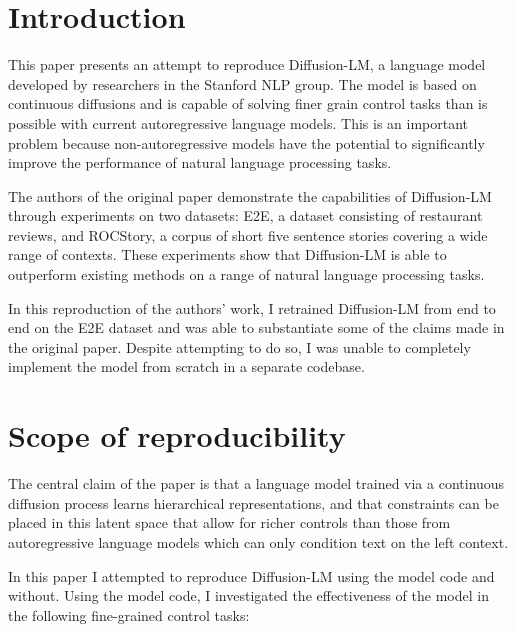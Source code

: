 \section{Introduction}

This paper presents an attempt to reproduce Diffusion-LM, a language model developed by researchers in the Stanford NLP group. The model is based on continuous diffusions and is capable of solving finer grain control tasks than is possible with current autoregressive language models. This is an important problem because non-autoregressive models have the potential to significantly improve the performance of natural language processing tasks.

The authors of the original paper demonstrate the capabilities of Diffusion-LM through experiments on two datasets: E2E, a dataset consisting of restaurant reviews, and ROCStory, a corpus of short five sentence stories covering a wide range of contexts. These experiments show that Diffusion-LM is able to outperform existing methods on a range of natural language processing tasks.

In this reproduction of the authors' work, I retrained Diffusion-LM from end to end on the E2E dataset and was able to substantiate some of the claims made in the original paper. Despite attempting to do so, I was unable to completely implement the model from scratch in a separate codebase.

\section{Scope of reproducibility}
\label{sec:claims}

The central claim of the paper is that a language model trained via a continuous diffusion process learns hierarchical representations, and that constraints can be placed in this latent space that allow for richer controls than those from autoregressive language models which can only condition text on the left context.

In this paper I attempted to reproduce Diffusion-LM using the model code and without. Using the model code, I investigated the effectiveness of the model in the following fine-grained  control tasks:

